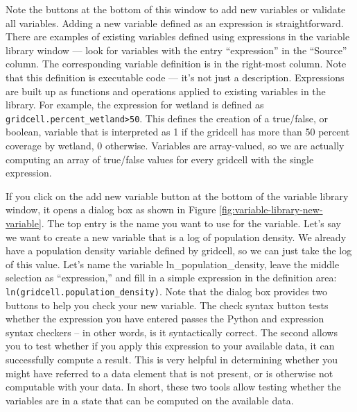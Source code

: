 Note the buttons at the bottom of this window to add new variables or
validate all variables.  Adding a new variable defined as an expression is
straightforward.  There are examples of existing variables defined using
expressions in the variable library window --- look for variables with the
entry ``expression'' in the ``Source'' column.  The corresponding variable
definition is in the right-most column.  Note that this definition is
executable code --- it's not just a description.  Expressions are built up
as functions and operations applied to existing variables in the library.
For example, the expression for wetland is defined as
\mbox{\tt gridcell.percent_wetland>50}.  This defines the creation of a
true/false, or boolean, variable that is interpreted as 1 if the gridcell
has more than 50 percent coverage by wetland, 0 otherwise.  Variables are
array-valued, so we are actually computing an array of true/false values
for every gridcell with the single expression.

If you click on the add new variable button at the bottom of the variable
library window, it opens a dialog box as shown in Figure
\ref{fig:variable-library-new-variable}.  The top entry is the name you
want to use for the variable.  Let's say we want to create a new variable
that is a log of population density.  We already have a population density
variable defined by gridcell, so we can just take the log of this value.
Let's name the variable ln\_population\_density, leave the middle selection
as ``expression,'' and fill in a simple expression in the definition
area: \mbox{\tt ln(gridcell.population_density)}.  Note that the dialog box
provides two buttons to help you check your new variable.  The check syntax
button tests whether the expression you have entered passes the Python and
expression syntax checkers -- in other words, is it syntactically correct.
The second allows you to test whether if you apply this expression to your
available data, it can successfully compute a result.  This is very helpful
in determining whether you might have referred to a data element that is
not present, or is otherwise not computable with your data.  In short,
these two tools allow testing whether the variables are in a state that can
be computed on the available data.

